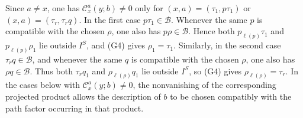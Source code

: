 \documentclass[11pt,a4paper,reqno]{amsart}
\newcommand{\mB}{\mathcal B}
\newcommand{\mC}{\mathcal C}
\newcommand{\para}[2]{(#1,#2)}
\theoremstyle{plain}
\theoremstyle{definition}
\numberwithin{equation}{section}
\begin{document}
	Since $a\neq x$, one has $\mC_x^a(y;b)\neq0$ only for
	$\para{x}{a}=\para{\tau_1}{p\tau_1}$ or
	$\para{x}{a}=\para{\tau_r}{\tau_rq}$.
	In the first case $p\tau_1\in\mB$. Whenever the same $p$ is compatible
	with the chosen $\rho$, one also has $p\rho\in\mB$. Hence both
	$p_{\ell(p)}\tau_1$ and $p_{\ell(p)}\rho_1$ lie outside $I^S$, and
	\textup{(G4)} gives $\rho_1=\tau_1$.
	Similarly, in the second case $\tau_rq\in\mB$, and whenever the same $q$ is
	compatible with the chosen $\rho$, one also has $\rho q\in\mB$. Thus both
	$\tau_rq_1$ and $\rho_{\ell(\rho)}q_1$ lie outside $I^S$, so
	\textup{(G4)} gives $\rho_{\ell(\rho)}=\tau_r$.
	In the cases below with $\mC_x^a(y;b)\neq0$, the nonvanishing of the
	corresponding projected product allows the description of $b$ to be chosen
	compatibly with the path factor occurring in that product.
	
\end{document}
